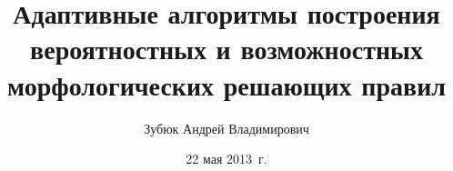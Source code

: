 

\title{Адаптивные алгоритмы построения вероятностных и возможностных морфологических решающих правил}
\author{Зубюк Андрей Владимирович}
\date{22 мая 2013~г.}


\sloppy

\maketitle









